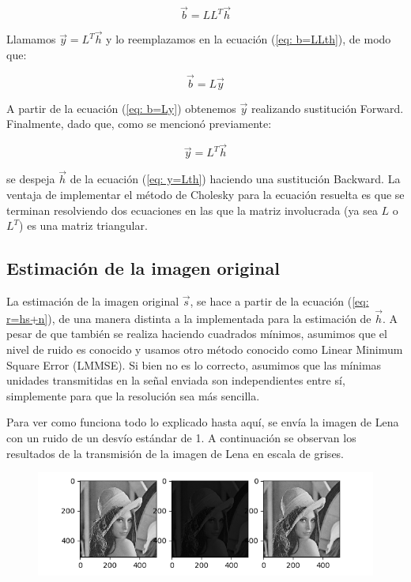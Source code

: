 \begin{equation} 
\vec{b} = L L^T \vec{h} 
\label{eq: b=LLth}
\end{equation} 

Llamamos $\vec{y} = L^T \vec{h}$ y lo reemplazamos en la ecuaci\'on (\ref{eq: b=LLth}), de modo que:

\begin{equation} 
\vec{b} = L \vec{y}
\label{eq: b=Ly}
\end{equation} 

A partir de la ecuaci\'on (\ref{eq: b=Ly}) obtenemos $ \vec{y}$ realizando sustituci\'on Forward. Finalmente, dado que, como se mencion\'o previamente:

 \begin{equation} 
\vec{y} = L^T \vec{h} 
\label{eq: y=Lth}
\end{equation}

se despeja $\vec{h}$ de la ecuaci\'on (\ref{eq: y=Lth}) haciendo una sustituci\'on Backward. La ventaja de implementar el m\'etodo de Cholesky para la ecuaci\'on resuelta es que se terminan resolviendo dos ecuaciones en las que la matriz involucrada (ya sea $L$ o $L^T$) es una matriz triangular.

\subsection{Estimaci\'on de la imagen original}

La estimaci\'on de la imagen original $\vec{s}$, se hace a partir de la ecuaci\'on (\ref{eq: r=hs+n}), de una manera distinta a la implementada para la estimaci\'on de  $\vec{h}$. A pesar de que tambi\'en se realiza haciendo cuadrados m\'inimos, asumimos que el nivel de ruido es conocido y usamos otro m\'etodo  conocido como Linear Minimum Square Error (LMMSE). Si bien no es lo correcto, asumimos que las m\'inimas unidades transmitidas en la se\~nal enviada son independientes entre s\'i, simplemente para que la resoluci\'on sea m\'as sencilla. 


Para ver como funciona todo lo explicado hasta aqu\'i, se env\'ia la imagen de Lena con un ruido de un desv\'io est\'andar de 1. A continuaci\'on se observan los resultados de la transmisi\'on de la imagen de Lena en escala de grises.
 

\begin{figure}[H]
	\includegraphics[scale=1]{Imagenes/E32S01}
	\centering
\end{figure}
 
